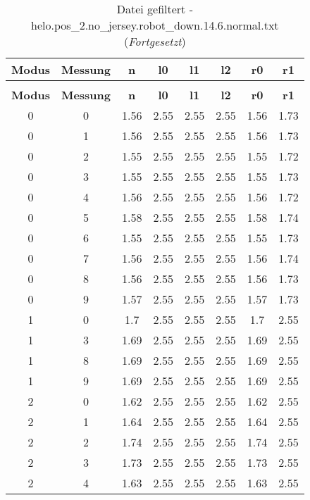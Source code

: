 \begin{longtable}{|c|c||c||c|c|c||c|c|}
	\caption{Datei gefiltert - helo.pos\_2.no\_jersey.robot\_down.14.6.normal.txt} \label{tab:helo.pos-2.no-jersey.robot-down.14.6.normal.txt} \\ \hline
	\textbf{Modus} & \textbf{Messung} & \textbf{n} & \textbf{l0} & \textbf{l1} & \textbf{l2} & \textbf{r0} & \textbf{r1}\\ \hline
	\endfirsthead
	\caption[]{Datei gefiltert - helo.pos\_2.no\_jersey.robot\_down.14.6.normal.txt (\emph{Fortgesetzt})} \\ \hline
	\textbf{Modus} & \textbf{Messung} & \textbf{n} & \textbf{l0} & \textbf{l1} & \textbf{l2} & \textbf{r0} & \textbf{r1}\\ \hline
	\endhead
	0 & 0 & 1.56 & 2.55 & 2.55 & 2.55 & 1.56 & 1.73 \\ \hline
	0 & 1 & 1.56 & 2.55 & 2.55 & 2.55 & 1.56 & 1.73 \\ \hline
	0 & 2 & 1.55 & 2.55 & 2.55 & 2.55 & 1.55 & 1.72 \\ \hline
	0 & 3 & 1.55 & 2.55 & 2.55 & 2.55 & 1.55 & 1.73 \\ \hline
	0 & 4 & 1.56 & 2.55 & 2.55 & 2.55 & 1.56 & 1.72 \\ \hline
	0 & 5 & 1.58 & 2.55 & 2.55 & 2.55 & 1.58 & 1.74 \\ \hline
	0 & 6 & 1.55 & 2.55 & 2.55 & 2.55 & 1.55 & 1.73 \\ \hline
	0 & 7 & 1.56 & 2.55 & 2.55 & 2.55 & 1.56 & 1.74 \\ \hline
	0 & 8 & 1.56 & 2.55 & 2.55 & 2.55 & 1.56 & 1.73 \\ \hline
	0 & 9 & 1.57 & 2.55 & 2.55 & 2.55 & 1.57 & 1.73 \\ \hline
	1 & 0 & 1.7 & 2.55 & 2.55 & 2.55 & 1.7 & 2.55 \\ \hline
	1 & 3 & 1.69 & 2.55 & 2.55 & 2.55 & 1.69 & 2.55 \\ \hline
	1 & 8 & 1.69 & 2.55 & 2.55 & 2.55 & 1.69 & 2.55 \\ \hline
	1 & 9 & 1.69 & 2.55 & 2.55 & 2.55 & 1.69 & 2.55 \\ \hline
	2 & 0 & 1.62 & 2.55 & 2.55 & 2.55 & 1.62 & 2.55 \\ \hline
	2 & 1 & 1.64 & 2.55 & 2.55 & 2.55 & 1.64 & 2.55 \\ \hline
	2 & 2 & 1.74 & 2.55 & 2.55 & 2.55 & 1.74 & 2.55 \\ \hline
	2 & 3 & 1.73 & 2.55 & 2.55 & 2.55 & 1.73 & 2.55 \\ \hline
	2 & 4 & 1.63 & 2.55 & 2.55 & 2.55 & 1.63 & 2.55 \\ \hline

\end{longtable}
